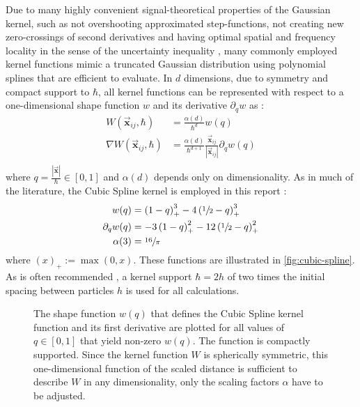 \documentclass[oneside, a4paper]{book}
\newcommand\abs[1]{\left|#1\right|}
\newcommand\vek[1]{\vec{\bm{#1}}}
\newcommand\br[1]{\left(#1\right)}
\begin{document}
    Due to many highly convenient signal-theoretical properties of the Gaussian kernel, such as not overshooting approximated step-functions, not creating new zero-crossings of second derivatives and having optimal spatial and frequency locality in the sense of the uncertainty inequality \autocite{gauss-optimal}, many commonly employed kernel functions mimic a truncated Gaussian distribution using polynomial splines that are efficient to evaluate. In $d$ dimensions, due to symmetry and compact support to $\hbar$, all kernel functions can be represented with respect to a one-dimensional shape function $w$ and its derivative $\partial_q w$ as \autocite{band-phd}:
    \begin{align}
      W(\vek{x}_{ij}, \hbar) &= \frac{\alpha(d)}{\hbar^d}w\br{q}\\
      \nabla W(\vek{x}_{ij}, \hbar) &= \frac{\alpha(d)}{\hbar^{d+1}}\frac{\vek{x}_{ij}}{\abs{\vek{x}_{ij}}} \partial_q w\br{q}\\
    \end{align}
    where $q = \frac{\abs{\vek{x}}}{\hbar} \in \left[0,1\right]$ and $\alpha(d)$ depends only on dimensionality. As in much of the literature, the Cubic Spline kernel is employed in this report \autocite{band-phd}:
    \begin{align}
      w(q) &= \br{1-q}^3_+ - 4\br{\sfrac{1}{2}-q}^3_+\\
      \partial_q w(q) &= -3\br{1-q}^2_+ - 12\br{\sfrac{1}{2}-q}^2_+\\
      \alpha(3) &= \sfrac{16}{\pi}
    \end{align}
    where $(x)_+ := \max\br{0, x}$. These functions are illustrated in \autoref{fig:cubic-spline}. As is often recommended \autocite{tutorial2019}, a kernel support $\hbar=2h$ of two times the initial spacing between particles $h$ is used for all calculations.

    \begin{figure}
      \centering
      \caption{The shape function $w(q)$ that defines the Cubic Spline kernel function and its first derivative are plotted for all values of $q\in[0,1]$ that yield non-zero $w(q)$. The function is compactly supported. Since the kernel function $W$ is spherically symmetric, this one-dimensional function of the scaled distance is sufficient to describe $W$ in any dimensionality, only the scaling factors $\alpha$ have to be adjusted.}\label{fig:cubic-spline}
    \end{figure}
\end{document}
